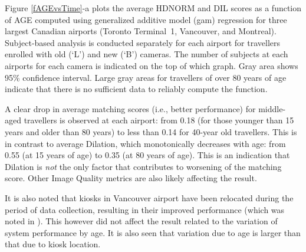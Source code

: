 \documentclass{cta-author}%
\begin{document}


Figure \ref{fAGEvsTime}-a %
plots the average HDNORM and  DIL scores as a function of AGE computed using generalized additive model (gam) regression
\cite{R-book} for   three largest Canadian airports (Toronto Terminal~1, Vancouver, and Montreal).
Subject-based analysis is conducted separately for each airport for travellers enrolled with old (`L') and new (`B') cameras.
The number of subjects at each airports for each camera is indicated on the top of which graph.
Gray area shows 95\% confidence interval. 
Large gray areas for travellers of over 80 years of age indicate that there is no sufficient data to reliably compute the function.

A clear drop in average matching scores (i.e., better performance) for middle-aged travellers is observed at each airport: from 0.18 (for those younger than 15 years  and older than 80 years) to less than 0.14 for 40-year old travellers.
This is in contrast to average Dilation, which monotonically decreases with age: from 0.55 (at 15 years of age)  to 0.35 (at 80 years of age).
This is an indication that Dilation is \textit{not} the only factor that contributes to worsening of the matching score. 
Other Image Quality metrics are also likely affecting the result.

It is also noted that kiosks in Vancouver airport have been relocated during the period of data collection, resulting  in their improved performance (which was noted in \cite{Bowyer-BTAS2016}). This however did not affect the result related to the variation of system performance by age.
It is also seen that variation due to age  is larger than that due to kiosk location.
\end{document}
